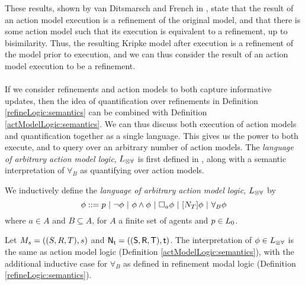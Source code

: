 These results, shown by van Ditsmarsch and French in \cite{van2009simulation}, state that the result
of an action model execution is a refinement of the original model, and that there is some action
model such that its execution is equivalent to a refinement, up to bisimilarity.
Thus, the resulting Kripke model after execution is a refinement of the model prior to
execution, and we can thus consider the result of an action model execution to be a refinement.\\
\\
If we consider refinements and action models to both capture informative updates,
then the idea of quantification over refinements in Definition \ref{refineLogic:semantics} can be
combined with Definition \ref{actModelLogic:semantics}.
We can thus discuss both execution of action models and quantification together as a single language.
This gives us the power to both execute, and to query over an arbitrary number of action models.
The {\em language of arbitrary action model logic}, $L_{\otimes\forall}$ is first defined in
\cite{hales13synthesis}, along with a semantic interpretation of $\forall_B$ as quantifying over
action models.

\begin{defn} \label{arbActLogic:syntax}
	We inductively define the {\em language of arbitrary action model logic}, $L_{\otimes\forall}$ by
\[
	\phi ::= p \text{ } | \text{ } \neg \phi \text{ } | \text{ } \phi \land \phi \text{ } | \text{ } \Box_a \phi \text{ } |
  \text{ }[{N_T}] \phi \text{ } | \text{ } \forall_B \phi
\]
where $a \in A$ and $B \subseteq A$, for $A$ a finite set of agents and $p \in L_0$.
\end{defn}

\begin{defn} \label{arbActLogic:semantics}
	Let $M_s = ((S,R,T),s)$ and $\mathrm{\mathsf{N}}_\mathrm{\mathsf{t}} = ((\mathrm{\mathsf{S}},\mathrm{\mathsf{R}},\mathrm{\mathsf{T}}),\mathrm{\mathsf{t}})$.
	The interpretation of $\phi \in L_{\otimes\forall}$ is the same as action model logic (Definition
	\ref{actModelLogic:semantics}), with the additional inductive case for $\forall_B$ as defined in
	refinement modal logic (Definition \ref{refineLogic:semantics}).
\end{defn}

